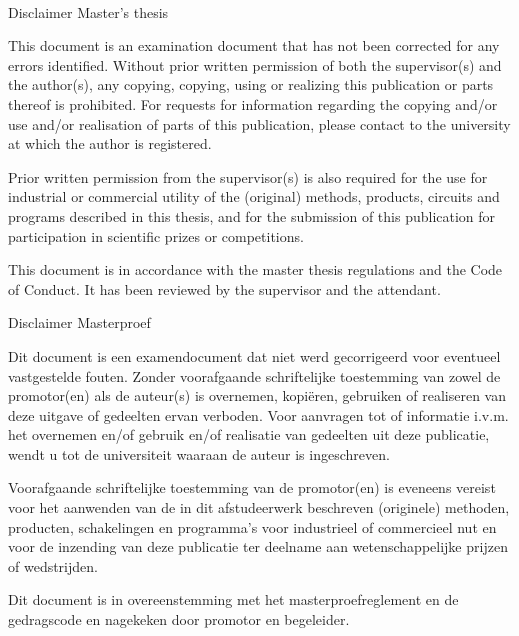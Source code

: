 \newpage
\rmfamily %
~
\vfill %

\begin{flushleft}
\small
{} {
Disclaimer Master's thesis

This document is an examination document that has not been corrected for any errors identified.
Without prior written permission of both the supervisor(s) and the author(s), any copying, copying, using or realizing this publication or parts thereof is prohibited.
For requests for information regarding the copying and/or use and/or realisation of parts of this publication, please contact to the university at which the author is registered.

Prior written permission from the supervisor(s) is also required for the use for industrial or commercial utility of the (original) methods, products, circuits and programs described in this thesis,  and for the submission of this publication for participation in scientific prizes or competitions.

This document is in accordance with the master thesis regulations and the Code of Conduct.
It has been reviewed by the supervisor and the attendant.
}{
Disclaimer Masterproef

Dit document is een examendocument dat niet werd gecorrigeerd voor eventueel vastgestelde fouten.
Zonder voorafgaande schriftelijke toestemming van zowel de promotor(en) als de auteur(s) is overnemen, kopi\"{e}ren, gebruiken of realiseren van deze uitgave of gedeelten ervan verboden.
Voor aanvragen tot of informatie i.v.m. het overnemen en/of gebruik en/of realisatie van gedeelten uit deze publicatie, wendt u tot de universiteit waaraan de auteur is ingeschreven.


Voorafgaande schriftelijke toestemming van de promotor(en) is eveneens vereist voor het aanwenden van de in dit afstudeerwerk beschreven (originele) methoden, producten, schakelingen en programma's voor industrieel of commercieel nut en voor de inzending van deze publicatie ter deelname aan wetenschappelijke prijzen of wedstrijden.

Dit document is in overeenstemming met het masterproefreglement en de gedragscode en nagekeken door promotor en begeleider.
}
 \end{flushleft}

